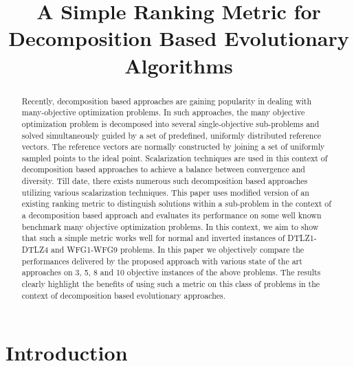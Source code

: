 \documentclass{sig-alternate}
\begin{document}
 
\title{A Simple Ranking Metric for Decomposition Based Evolutionary Algorithms}

\maketitle
\begin{abstract} 
Recently, decomposition based approaches are gaining popularity in dealing with many-objective optimization problems. In such approaches, the many objective optimization problem is decomposed into several single-objective sub-problems and solved simultaneously guided by a set of predefined, uniformly distributed reference vectors. The reference vectors are normally constructed by joining a set of uniformly sampled points to the ideal point. Scalarization techniques are used in this context of decomposition based approaches to achieve a balance between convergence and diversity. Till date, there exists numerous such decomposition based approaches utilizing various scalarization techniques. This paper uses modified version of an existing ranking metric to distinguish solutions within a sub-problem in the context of a decomposition based approach and evaluates its performance on some well known benchmark many objective optimization problems. In this context, we aim to show that such a simple metric works well for normal and inverted instances of DTLZ1-DTLZ4 and WFG1-WFG9 problems. In this paper we objectively compare the performances delivered by the proposed approach with various state of the art approaches on 3, 5, 8 and 10 objective instances of the above problems. The results clearly highlight the benefits of using such a metric on this class of problems in the context of decomposition based evolutionary approaches.\\ 
\end{abstract}



\section{Introduction} 
\end{document}
